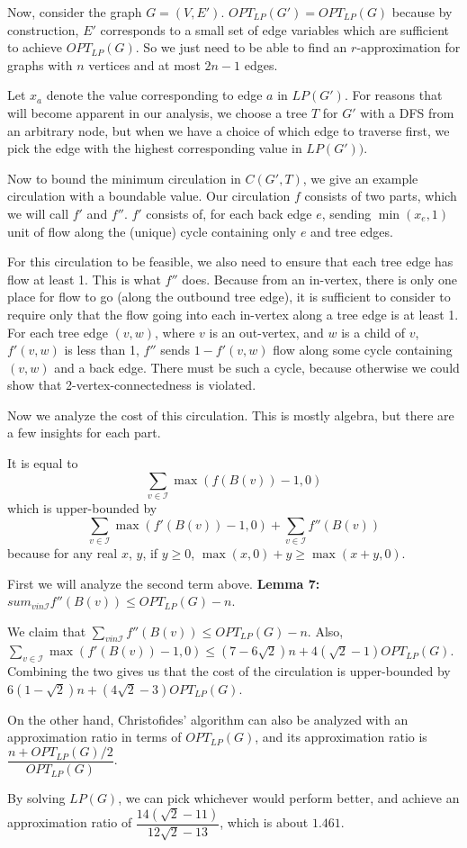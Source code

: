 \documentclass[12pt]{article}
\begin{document}
Now, consider the graph $G = (V, E')$.  $OPT_{LP}(G') = OPT_{LP}(G)$ because by
construction, $E'$ corresponds to a small set of edge variables which are sufficient
to achieve $OPT_{LP}(G)$.  So we just need to be able to find an
$r$-approximation for graphs with $n$ vertices and at most $2n-1$ edges.

Let $x_a$ denote the value corresponding to edge $a$ in $LP(G')$.  For reasons that will
become apparent in our analysis, we choose a tree $T$ for $G'$ with a DFS from an
arbitrary node, but when we have a choice of which edge to traverse first, we
pick the edge with the highest corresponding value in $LP(G'))$.

Now to bound the minimum circulation in $C(G', T)$, we give an example
circulation with a boundable value.  Our circulation $f$ consists of two parts,
which we will call $f'$ and $f''$.  $f'$ consists of, for each back edge $e$,
sending $\min(x_e, 1)$ unit of flow along the (unique) cycle containing only $e$
and tree edges.

For this circulation to be feasible, we also need to ensure that each tree edge
has flow at least 1.  This is what $f''$ does.  Because from an in-vertex, there
is only one place for flow to go (along the outbound tree edge), it is
sufficient to consider to require only that the flow going into each in-vertex
along a tree edge is at least 1. For each tree edge $(v, w)$, where $v$ is an
out-vertex, and $w$ is a child of $v$, $f'(v,w)$ is less than 1, $f''$ sends $1
- f'(v,w)$ flow along some cycle containing $(v,w)$ and a back edge.  There must be
such a cycle, because otherwise we could show that 2-vertex-connectedness is
violated.

Now we analyze the cost of this circulation.  This is mostly algebra, but there
are a few insights for each part.

It is equal to 
\[
\sum_{v \in \mathcal{I}} \max(f(B(v))-1, 0)
\]
which is upper-bounded by
\[
\sum_{v \in \mathcal{I}} \max(f'(B(v))-1,0) + \sum_{v \in \mathcal{I}} f''(B(v))
\]
because for any real $x$, $y$, if $y \ge 0$, $\max \left ( x, 0 \right ) + y \ge \max
\left ( x + y, 0 \right )$.

First we will analyze the second term above.
{\bf Lemma 7:}
$sum_{v in \mathcal{I}} f''(B(v)) \le OPT_{LP}(G) - n$.


We claim that $\sum_{v in \mathcal{I}} f''(B(v)) \le OPT_{LP}(G) - n$.
Also, $\sum_{v \in \mathcal{I}} \max(f'(B(v)) - 1, 0) \le (7 - 6 \sqrt{2})n +
4(\sqrt{2} - 1)OPT_{LP}(G)$.  
Combining the two gives us that the cost of the circulation is upper-bounded by
$6(1- \sqrt{2})n + (4\sqrt{2} - 3)OPT_{LP}(G)$.

On the other hand, Christofides' algorithm can also be analyzed with an
approximation ratio in terms of $OPT_{LP}(G)$, and its approximation ratio is
$\dfrac{n + OPT_{LP}(G)/2}{OPT_{LP}(G)}$.

By solving $LP(G)$, we can pick whichever would perform better, and achieve an
approximation ratio of $\dfrac{14(\sqrt{2} - 11)}{12\sqrt{2} - 13}$, which is
about $1.461$.



\end{document}
